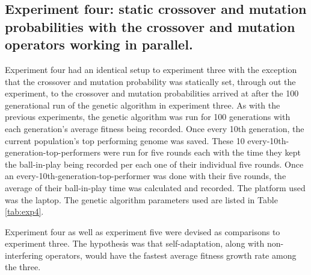 \documentclass[a4paper,10pt]{article}
\begin{document}
\subsection{Experiment four: static crossover and mutation probabilities with the crossover and mutation operators working in parallel.}

Experiment four had an identical setup to experiment three with the exception that the crossover and mutation probability was statically set, through out the experiment, to the crossover and mutation probabilities arrived at after the 100 generational run of the genetic algorithm in experiment three. As with the previous experiments, the genetic algorithm was run for 100 generations with each generation's average fitness being recorded. Once every 10th generation, the current population's top performing genome was saved. These 10 every-10th-generation-top-performers were run for five rounds each with the time they kept the ball-in-play being recorded per each one of their individual five rounds. Once an every-10th-generation-top-performer was done with their five rounds, the average of their ball-in-play time was calculated and recorded. The platform used was the laptop. The genetic algorithm parameters used are listed in Table \ref{tab:exp4}.

Experiment four as well as experiment five were devised as comparisons to experiment three. The hypothesis was that self-adaptation, along with non-interfering operators, would have the fastest average fitness growth rate among the three.
\end{document}
